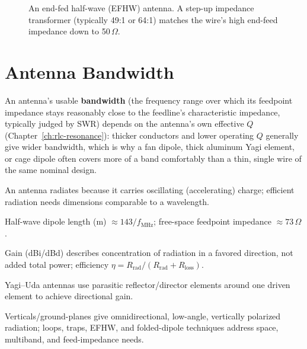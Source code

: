 \begin{figure}[H]
\centering
{}
\caption{An end-fed half-wave (EFHW) antenna. A step-up impedance
transformer (typically 49:1 or 64:1) matches the wire's high end-feed
impedance down to 50\,$\Omega$.}
\end{figure}

\section{Antenna Bandwidth}


An antenna's usable \textbf{bandwidth} (the frequency range over which
its feedpoint impedance stays reasonably close to the feedline's
characteristic impedance, typically judged by SWR) depends on the
antenna's own effective $Q$ (Chapter~\ref{ch:rlc-resonance}): thicker
conductors and lower operating $Q$ generally give wider bandwidth,
which is why a fan dipole, thick aluminum Yagi element, or cage dipole
often covers more of a band comfortably than a thin, single wire of the
same nominal design.

\begin{quickreview}
\item An antenna radiates because it carries oscillating (accelerating)
charge; efficient radiation needs dimensions comparable to a wavelength.
\item Half-wave dipole length (m) $\approx 143/f_{\text{MHz}}$;
free-space feedpoint impedance $\approx 73\,\Omega$.
\item Gain (dBi/dBd) describes concentration of radiation in a favored
direction, not added total power; efficiency $\eta =
R_{\text{rad}}/(R_{\text{rad}}+R_{\text{loss}})$.
\item Yagi--Uda antennas use parasitic reflector/director elements
around one driven element to achieve directional gain.
\item Verticals/ground-planes give omnidirectional, low-angle,
vertically polarized radiation; loops, traps, EFHW, and folded-dipole
techniques address space, multiband, and feed-impedance needs.
\end{quickreview}

